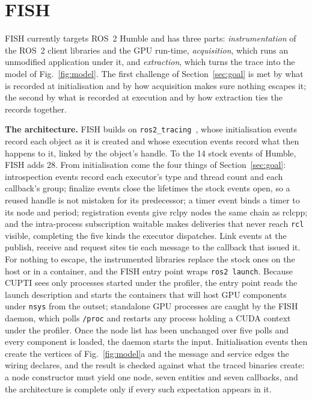 \section{FISH}
\label{sec:method}
FISH currently targets ROS~2 Humble and has three parts: \emph{instrumentation} of the ROS~2 client libraries and the GPU run-time, \emph{acquisition}, which runs an unmodified application under it, and \emph{extraction}, which turns the trace into the model of Fig.~\ref{fig:model}. The first challenge of Section~\ref{sec:goal} is met by what is recorded at initialisation and by how acquisition makes sure nothing escapes it; the second by what is recorded at execution and by how extraction ties the records together.

\noindent\textbf{The architecture.} FISH builds on \texttt{ros2\_tracing}~\cite{bedard-2022-ros2tracing}, whose initialisation events record each object as it is created and whose execution events record what then happens to it, linked by the object's handle. To the 14 stock events of Humble, FISH adds 28. From initialisation come the four things of Section~\ref{sec:goal}: introspection events record each executor's type and thread count and each callback's group; finalize events close the lifetimes the stock events open, so a reused handle is not mistaken for its predecessor; a timer event binds a timer to its node and period; registration events give rclpy nodes the same chain as rclcpp; and the intra-process subscription waitable makes deliveries that never reach \texttt{rcl} visible, completing the five kinds the executor dispatches. Link events at the publish, receive and request sites tie each message to the callback that issued it. For nothing to escape, the instrumented libraries replace the stock ones on the host or in a container, and the FISH entry point wraps \texttt{ros2 launch}. Because CUPTI sees only processes started under the profiler, the entry point reads the launch description and starts the containers that will host GPU components under \texttt{nsys} from the outset; standalone GPU processes are caught by the FISH daemon, which polls \texttt{/proc} and restarts any process holding a CUDA context under the profiler. Once the node list has been unchanged over five polls and every component is loaded, the daemon starts the input. Initialisation events then create the vertices of Fig.~\ref{fig:model}a and the message and service edges the wiring declares, and the result is checked against what the traced binaries create: a node constructor must yield one node, seven entities and seven callbacks, and the architecture is complete only if every such expectation appears in it.

